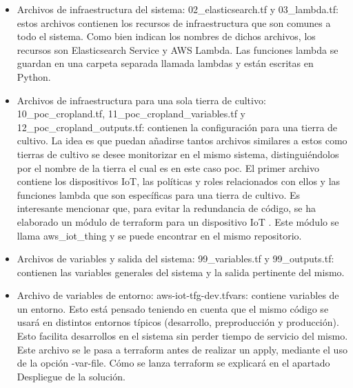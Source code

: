 \documentclass[../../memoria.tex]{subfiles}
\begin{document}
\begin{enumerate}
\begin{itemize}
              \item Archivos de infraestructura del sistema: 02\_elasticsearch.tf y 03\_lambda.tf: estos archivos contienen los recursos de infraestructura que son comunes a todo el sistema. Como bien indican los nombres de dichos archivos, los recursos son Elasticsearch Service y AWS Lambda. Las funciones lambda se guardan en una carpeta separada llamada lambdas y están escritas en Python.

              \item Archivos de infraestructura para una sola tierra de cultivo: 10\_poc\_cropland.tf, 11\_poc\_cropland\_variables.tf y 12\_poc\_cropland\_outputs.tf: contienen la configuración para una tierra de cultivo. La idea es que puedan añadirse tantos archivos similares a estos como tierras de cultivo se desee monitorizar en el mismo sistema, distinguiéndolos por el nombre de la tierra el cual es en este caso poc. El primer archivo contiene los dispositivos IoT, las políticas y roles relacionados con ellos y las funciones lambda que son específicas para una tierra de cultivo. Es interesante mencionar que, para evitar la redundancia de código, se ha elaborado un módulo de terraform para un dispositivo IoT \cite{terraformmodules}. Este módulo se llama aws\_iot\_thing y se puede encontrar en el mismo repositorio.

              \item Archivos de variables y salida del sistema: 99\_variables.tf y 99\_outputs.tf: contienen las variables generales del sistema y la salida pertinente del mismo.

              \item Archivo de variables de entorno: aws-iot-tfg-dev.tfvars: contiene variables de un entorno. Esto está pensado teniendo en cuenta que el mismo código se usará en distintos entornos típicos (desarrollo, preproducción y producción). Esto facilita desarrollos en el sistema sin perder tiempo de servicio del mismo. Este archivo se le pasa a terraform antes de realizar un apply, mediante el uso de la opción -var-file. Cómo se lanza terraform se explicará en el apartado Despliegue de la solución.
          \end{itemize}

\end{enumerate}
\end{document}
